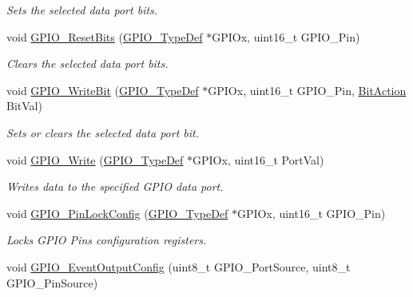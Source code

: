 \begin{DoxyCompactItemize}
\begin{DoxyCompactList}\small\item\em Sets the selected data port bits. \end{DoxyCompactList}\item 
void \mbox{\hyperlink{group___g_p_i_o___exported___functions_ga6fcd35b207a66608dd2c9d7de9247dc8}{G\+P\+I\+O\+\_\+\+Reset\+Bits}} (\mbox{\hyperlink{struct_g_p_i_o___type_def}{G\+P\+I\+O\+\_\+\+Type\+Def}} $\ast$G\+P\+I\+Ox, uint16\+\_\+t G\+P\+I\+O\+\_\+\+Pin)
\begin{DoxyCompactList}\small\item\em Clears the selected data port bits. \end{DoxyCompactList}\item 
void \mbox{\hyperlink{group___g_p_i_o___exported___functions_ga8f7b237fd744d9f7456fbe0da47a9b80}{G\+P\+I\+O\+\_\+\+Write\+Bit}} (\mbox{\hyperlink{struct_g_p_i_o___type_def}{G\+P\+I\+O\+\_\+\+Type\+Def}} $\ast$G\+P\+I\+Ox, uint16\+\_\+t G\+P\+I\+O\+\_\+\+Pin, \mbox{\hyperlink{group___g_p_i_o___exported___types_ga176130b21c0e719121470a6042d4cf19}{Bit\+Action}} Bit\+Val)
\begin{DoxyCompactList}\small\item\em Sets or clears the selected data port bit. \end{DoxyCompactList}\item 
void \mbox{\hyperlink{group___g_p_i_o___exported___functions_gaa925f19c8547a00c7a0c269a84873bf9}{G\+P\+I\+O\+\_\+\+Write}} (\mbox{\hyperlink{struct_g_p_i_o___type_def}{G\+P\+I\+O\+\_\+\+Type\+Def}} $\ast$G\+P\+I\+Ox, uint16\+\_\+t Port\+Val)
\begin{DoxyCompactList}\small\item\em Writes data to the specified G\+P\+IO data port. \end{DoxyCompactList}\item 
void \mbox{\hyperlink{group___g_p_i_o___exported___functions_gad2f2e615928c69fd0d8c641a7cedaafc}{G\+P\+I\+O\+\_\+\+Pin\+Lock\+Config}} (\mbox{\hyperlink{struct_g_p_i_o___type_def}{G\+P\+I\+O\+\_\+\+Type\+Def}} $\ast$G\+P\+I\+Ox, uint16\+\_\+t G\+P\+I\+O\+\_\+\+Pin)
\begin{DoxyCompactList}\small\item\em Locks G\+P\+IO Pins configuration registers. \end{DoxyCompactList}\item 
void \mbox{\hyperlink{group___g_p_i_o___exported___functions_ga935f31ed7a86c6cb594cf34313b4b7af}{G\+P\+I\+O\+\_\+\+Event\+Output\+Config}} (uint8\+\_\+t G\+P\+I\+O\+\_\+\+Port\+Source, uint8\+\_\+t G\+P\+I\+O\+\_\+\+Pin\+Source)

\end{DoxyCompactItemize}
